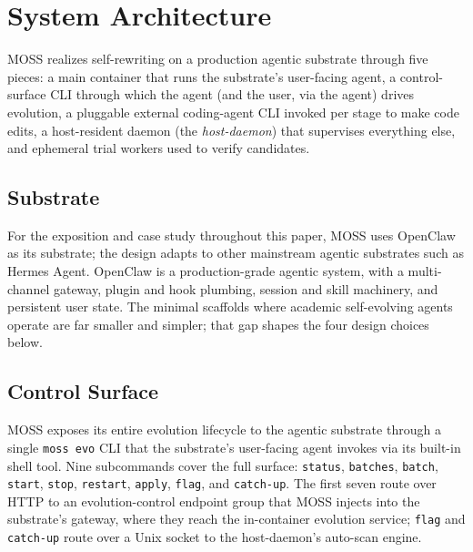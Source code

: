 \section{System Architecture}
\label{sec:arch}

MOSS realizes self-rewriting on a production agentic substrate through five pieces: a main container that runs the substrate's user-facing agent, a control-surface CLI through which the agent (and the user, via the agent) drives evolution, a pluggable external coding-agent CLI invoked per stage to make code edits, a host-resident daemon (the \emph{host-daemon}) that supervises everything else, and ephemeral trial workers used to verify candidates.

\subsection{Substrate}
\label{subsec:substrate}

For the exposition and case study throughout this paper, MOSS uses OpenClaw~\citep{openclaw-github} as its substrate; the design adapts to other mainstream agentic substrates such as Hermes Agent. OpenClaw is a production-grade agentic system, with a multi-channel gateway, plugin and hook plumbing, session and skill machinery, and persistent user state. The minimal scaffolds where academic self-evolving agents operate are far smaller and simpler; that gap shapes the four design choices below.

\subsection{Control Surface}
\label{subsec:control-surface}

MOSS exposes its entire evolution lifecycle to the agentic substrate through a single \texttt{moss evo} CLI that the substrate's user-facing agent invokes via its built-in shell tool. Nine subcommands cover the full surface: \texttt{status}, \texttt{batches}, \texttt{batch}, \texttt{start}, \texttt{stop}, \texttt{restart}, \texttt{apply}, \texttt{flag}, and \texttt{catch-up}. The first seven route over HTTP to an evolution-control endpoint group that MOSS injects into the substrate's gateway, where they reach the in-container evolution service; \texttt{flag} and \texttt{catch-up} route over a Unix socket to the host-daemon's auto-scan engine.

